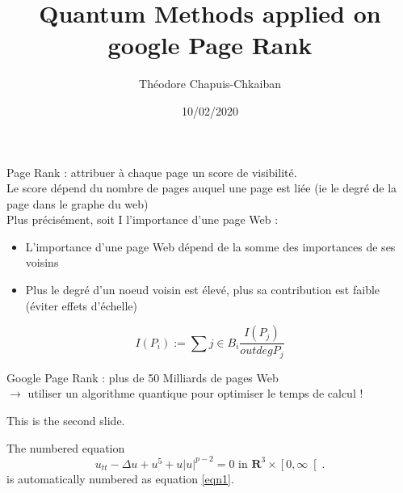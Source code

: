 \documentclass[titlepage,leqno]{slides}%
\begin{document}
\title{Quantum Methods applied on google Page Rank}
\author{Théodore Chapuis-Chkaiban}
\date{10/02/2020}
\maketitle
\begin{slide}{1}
Page Rank : attribuer à chaque page un score de visibilité. \\
Le score dépend du nombre de pages auquel une page est liée (ie le degré de la page dans le graphe du web)\\
Plus précisément, soit I l'importance d'une page Web :
\begin{itemize}
	\item L'importance d'une page Web dépend de la somme des importances de ses voisins
	\item Plus le degré d'un noeud voisin est élevé, plus sa contribution est faible (éviter effets d'échelle)
\end{itemize}

\begin{equation*}
I(P_{i}) := \sum{j \in B_{i}} \frac{I(P_{j})}{outdeg{P_{j}}}
\end{equation*}

\end{slide}

\begin{slide}{2}
Google Page Rank : plus de 50 Milliards de pages Web \\
$\rightarrow$ utiliser un algorithme quantique pour optimiser le temps de calcul ! \\


\end{slide}
\begin{slide}{2}
This is the second slide.

The numbered equation
\begin{equation}
u_{tt}-\Delta u+u^{5}+u\left|  u\right|  ^{p-2}=0\text{ in }\mathbf{R}%
^{3}\times\left[  0,\infty\right[  .\label{eqn1}%
\end{equation}
is automatically numbered as equation \ref{eqn1}.

\end{slide}
\end{document}
